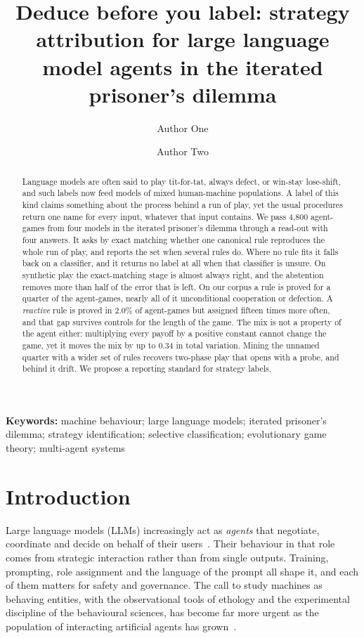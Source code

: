 \documentclass[11pt,a4paper]{article}
\title{\bfseries Deduce before you label: strategy attribution for large
language model agents in the iterated prisoner's dilemma}
\author[1]{Author One}
\author[1,2]{Author Two}
\affil[1]{Affiliation One}
\affil[2]{Affiliation Two}
\date{}
\begin{document}
\maketitle

\begin{abstract}
\noindent
Language models are often said to play tit-for-tat, always defect, or win-stay
lose-shift, and such labels now feed models of mixed human-machine populations.
A label of this kind claims something about the process behind a run of play,
yet the usual procedures return one name for every input, whatever that input
contains. We pass 4{,}800 agent-games from four models in the iterated
prisoner's dilemma through a read-out with four answers. It asks by exact
matching whether one canonical rule reproduces the whole run of play, and
reports the set when several rules do. Where no rule fits it falls back on a
classifier, and it returns no label at all when that classifier is unsure. On
synthetic play the exact-matching stage is almost always right, and the
abstention removes more than half of the error that is left. On our corpus a
rule is proved for a quarter of the agent-games, nearly all of it unconditional
cooperation or defection. A \emph{reactive} rule is proved in 2.0\% of
agent-games but assigned fifteen times more often, and that gap survives
controls for the length of the game. The mix is not a property of the agent
either: multiplying every payoff by a positive constant cannot change the game,
yet it moves the mix by up to 0.34 in total variation. Mining the unnamed
quarter with a wider set of rules recovers two-phase play that opens with a
probe, and behind it drift. We propose a reporting standard for strategy labels.
\end{abstract}

\noindent\textbf{Keywords:} machine behaviour; large language models; iterated
prisoner's dilemma; strategy identification; selective classification;
evolutionary game theory; multi-agent systems

\section{Introduction}

Large language models (LLMs) increasingly act as \emph{agents} that negotiate,
coordinate and decide on behalf of their
users~\citep{park2023generative,dafoe2021cooperative}. Their behaviour in that
role comes from strategic interaction rather than from single outputs.
Training, prompting, role assignment and the language of the prompt all shape
it, and each of them matters for safety and governance. The call to study
machines as behaving entities, with the observational tools of ethology and
the experimental discipline of the behavioural sciences, has become far more
urgent as the population of interacting artificial agents has
grown~\citep{rahwan2019machine}.
\end{document}

